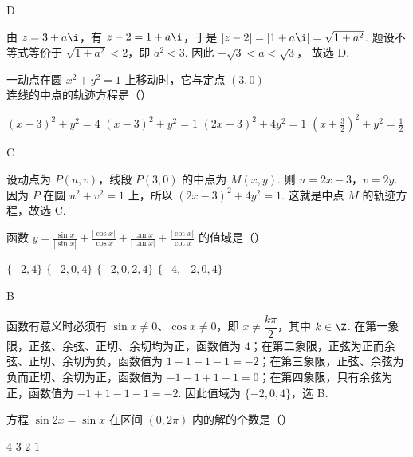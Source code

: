 \begin{answer}
D
\end{answer}

\begin{solution}
由 \(z=3+a\i\)，有 \(z-2=1+a\i\)，于是
\(|z-2|=|1+a\i|=\sqrt{1+a^2}\).
题设不等式等价于 \(\sqrt{1+a^2}<2\)，即 \(a^2<3\). 因此
\(-\sqrt{3}<a<\sqrt{3}\)，
故选 D.
\end{solution}

\begin{problem}
一动点在圆 \(x^2+y^2=1\) 上移动时，它与定点 \((3,0)\) 连线的中点的轨迹方程是（\quad）

\choices
    {\((x+3)^2+y^2=4\)}
    {\((x-3)^2+y^2=1\)}
    {\((2x-3)^2+4y^2=1\)}
    {\(\left( x+\frac{3}{2} \right)^2+y^2=\frac{1}{2}\)}
\end{problem}

\begin{answer}
C
\end{answer}

\begin{solution}
设动点为 \(P(u,v)\)，线段 \(P(3,0)\) 的中点为 \(M(x,y)\). 则
\(u=2x-3\)，\(v=2y\). 因为 \(P\) 在圆 \(u^2+v^2=1\) 上，所以 \((2x-3)^2+4y^2=1\).
这就是中点 \(M\) 的轨迹方程，故选 C.
\end{solution}

\begin{problem}
函数 \(y=\frac{\sin x}{|\sin x|}+\frac{|\cos x|}{\cos x}+\frac{\tan x}{|\tan x|}+\frac{|\cot x|}{\cot x}\) 的值域是（\quad）

\choices
    {\(\{-2,4\}\)}
    {\(\{-2,0,4\}\)}
    {\(\{-2,0,2,4\}\)}
    {\(\{-4,-2,0,4\}\)}
\end{problem}

\begin{answer}
B
\end{answer}

\begin{solution}
函数有意义时必须有 \(\sin x\ne0\)、\(\cos x\ne0\)，即 \(x\ne\dfrac{k\pi}{2}\)，其中 \(k\in\Z\). 在第一象限，正弦、余弦、正切、余切均为正，函数值为 \(4\)；在第二象限，正弦为正而余弦、正切、余切为负，函数值为 \(1-1-1-1=-2\)；在第三象限，正弦、余弦为负而正切、余切为正，函数值为 \(-1-1+1+1=0\)；在第四象限，只有余弦为正，函数值为 \(-1+1-1-1=-2\). 因此值域为 \(\{-2,0,4\}\)，选 B.
\end{solution}

\begin{problem}
方程 \(\sin 2x = \sin x\) 在区间 \((0,2\pi)\) 内的解的个数是（\quad）

\choices
    {\(4\)}
    {\(3\)}
    {\(2\)}
    {\(1\)}
\end{problem}

